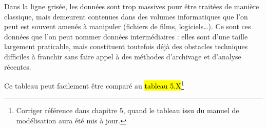 \noindent Dans la ligne grisée, les données sont trop massives pour être traitées de manière classique, mais demeurent contenues dans des volumes informatiques que l'on peut est souvent amenés à manipuler (fichiers de films, logiciels\ldots).
Ce sont ces données que l'on peut nommer \og données intermédiaires\fg{} : elles sont d'une taille largement praticable, mais constituent toutefois déjà des obstacles techniques difficiles à franchir sans faire appel à des méthodes d'archivage et d'analyse récentes.

\noindent Ce tableau peut facilement être comparé au \hl{tableau 5.X}\footnote{
	Corriger référence dans chapitre 5, quand le tableau issu du manuel de modélisation aura été mis à jour.
}
